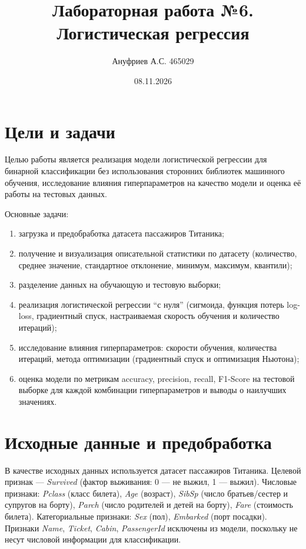 \documentclass[12pt,a4paper]{article}
\title{Лабораторная работа №6. Логистическая регрессия}
\author{Ануфриев А.С. 465029}
\date{08.11.2026}
\begin{document}
\maketitle

\section{Цели и задачи}
Целью работы является реализация модели логистической регрессии для бинарной классификации без использования сторонних библиотек машинного обучения, исследование влияния гиперпараметров на качество модели и оценка её работы на тестовых данных.

Основные задачи:
\begin{enumerate}
\item загрузка и предобработка датасета пассажиров Титаника;
\item получение и визуализация описательной статистики по датасету (количество, среднее значение, стандартное отклонение, минимум, максимум, квантили);
\item разделение данных на обучающую и тестовую выборки;
\item реализация логистической регрессии ``с нуля'' (сигмоида, функция потерь log-loss, градиентный спуск, настраиваемая скорость обучения и количество итераций);
\item исследование влияния гиперпараметров: скорости обучения, количества итераций, метода оптимизации (градиентный спуск и оптимизация Ньютона);
\item оценка модели по метрикам accuracy, precision, recall, F1-Score на тестовой выборке для каждой комбинации гиперпараметров и выводы о наилучших значениях.
\end{enumerate}

\section{Исходные данные и предобработка}
В качестве исходных данных используется датасет пассажиров Титаника. Целевой признак --- \emph{Survived} (фактор выживания: 0 --- не выжил, 1 --- выжил). Числовые признаки: \emph{Pclass} (класс билета), \emph{Age} (возраст), \emph{SibSp} (число братьев/сестер и супругов на борту), \emph{Parch} (число родителей и детей на борту), \emph{Fare} (стоимость билета). Категориальные признаки: \emph{Sex} (пол), \emph{Embarked} (порт посадки). Признаки \emph{Name}, \emph{Ticket}, \emph{Cabin}, \emph{PassengerId} исключены из модели, поскольку не несут числовой информации для классификации.
\end{document}
